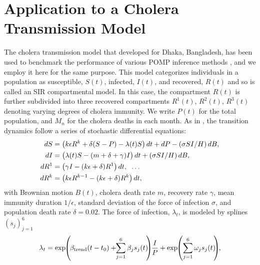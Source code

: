 \documentclass[11pt]{article}
\begin{document}
\section{Application to a Cholera Transmission Model}

The cholera transmission model that \cite{king08} developed for Dhaka, Bangladesh, has been used to benchmark the performance of various POMP inference methods \cite{ionides15, wood16, wycoff24}, and we employ it here for the same purpose.
This model categorizes individuals in a population as susceptible, $S(t)$, infected, $I(t)$, and recovered, $R(t)$ and so is called an SIR compartmental model.
In this case, the compartment $R(t)$ is further subdivided into 
three recovered compartments $R^1(t)$, $R^2(t)$, $R^3(t)$ denoting varying degrees of cholera immunity.
We write $P(t)$ for the total population, and $M_n$ for the cholera deaths in each month.
As in \cite{king08, ionides15}, the transition dynamics follow a series of stochastic differential equations:
\vspace*{-1mm}
\begin{align*}
    dS&=\big(k \epsilon R^k+\delta(S-P)-\lambda(t) S\big)\, dt+d P-({\sigma S I}/{H})\, dB, \\
    dI&=\big(\lambda(t) S-(m+\delta+\gamma) I\big)\, dt+({\sigma S I}/{H})\, dB, \\
    dR^1&=\big(\gamma I-(k \epsilon+\delta) R^1\big)\, dt, \hspace{2mm} \dots \\
    dR^k&=\big(k \epsilon R^{k-1} -(k \epsilon+\delta) R^k\big)\, dt,
    \vspace*{-2mm}
\end{align*}
with Brownian motion $B(t)$, cholera death rate $m$, recovery rate $\gamma$, mean immunity duration $1/\epsilon$, standard deviation of the force of infection $\sigma$, and population death rate $\delta=0.02$. The force of infection, $\lambda_t$, is modeled by splines $(s_j)_{j=1}^6$
\vspace*{-2mm}
\begin{equation*}    \lambda_t=\exp\hspace{-1mm}\left(\hspace{-.5mm}\beta_{\text{trend}}(t-t_0)+\hspace{-1mm}\sum_{j=1}^{6} \beta_j s_j(t)\hspace{-1mm}\right)\hspace{-1mm}\frac{I}{P} + \exp\hspace{-1mm} \left(\sum_{j=1}^{6} \omega_j s_j(t)\hspace{-1mm}\right)\hspace{-1mm},
    \vspace*{-2mm}
\end{equation*}
\end{document}
